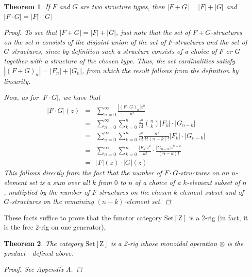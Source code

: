 \documentclass{amsart} \usepackage{amsmath,amssymb,bbm}
\newcommand{\opname}[1]{\operatorname{#1}}
\newcommand{\catname}[1]{\boldsymbol{\opname{{#1}}}}
\newcommand{\SetZ}{\catname{Set [ Z ]}}
\newtheorem{theorem}{Theorem}
\begin{document}
\begin{theorem}\label{thm:productthm}
  If $F$ and $G$ are two structure types, then $|F + G| = |F| + |G|$ and $|F
  \cdot G| = |F| \cdot |G|$
  
  \begin{proof}
    To see that $|F + G| = |F| + |G|$, just note that the set of $F +
    G$-structures on the set $n$ consists of the disjoint union of the set of
    $F$-structures and the set of $G$-structures, since by definition such a
    structure consists of a choice of $F$ or $G$ together with a structure of
    the chosen type.  Thus, the set cardinalities satisfy $| ( F + G )_n | =
    |F_n | + |G_n |$, from which the result follows from the definition by
    linearity.
    
    Now, as for $|F \cdot G|$, we have that
    \begin{eqnarray}
         |F \cdot G| ( z ) & = & \sum_{n = 0}^{\infty} \frac{| ( F \cdot G )_n
        |z^n}{n!}\\
         \nonumber & = & \sum_{n = 0}^{\infty} \sum_{k = 0}^n \frac{z^n}{n!}
        \binom{n}{k} |F_k | \cdot |G_{n - k} |\\
         \nonumber & = & \sum_{n = 0}^{\infty} \sum_{k = 0}^n \frac{z^n}{n!}
        \frac{n!}{k! ( n - k ) !} |F_k | \cdot |G_{n - k} |\\
         \nonumber & = & \sum_{n = 0}^{\infty} \sum_{k = 0}^n \frac{|F_k |z^k}{k!} \cdot
        \frac{|G_{n - k} |z^{n - k}}{( n - k ) !}\\
         \nonumber & = & |F| ( z ) \cdot |G| ( z )
    \end{eqnarray}
    This follows directly from the fact that the number of $F \cdot
    G$-structures on an $n$-element set is a sum over all $k$ from $0$ to $n$
    of a choice of a $k$-element subset of $n$, multiplied by the number of
    $F$-structures on the chosen $k$-element subset and of $G$-structures on
    the remaining $( n - k )$-element set.
  \end{proof}
\end{theorem}

These facts suffice to prove that the functor category $\SetZ$ is a
2-rig (in fact, it is the free 2-rig on one generator),

\begin{theorem}
  The category $\SetZ$ is a 2-rig whose monoidal
  operation $\otimes$ is the product $\cdot$ defined above.
  
  \begin{proof}
    See Appendix A.
  \end{proof}
\end{theorem}
\end{document}
